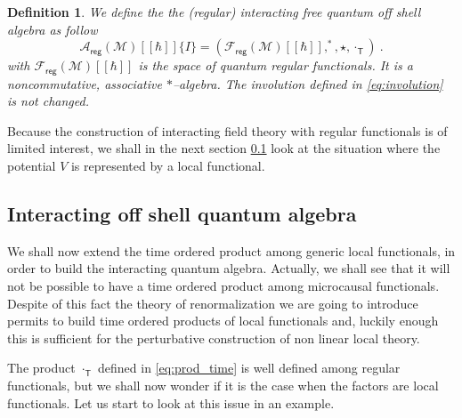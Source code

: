 \documentclass[11pt]{book}
\newcommand{\reg}{\mathsf{reg}}
\newcommand{\Acal}{\mathcal{A}}
\newcommand{\Fcal}{\mathcal{F}}
\newcommand{\Mcal}{\mathcal{M}}
\newcommand{\Tsf}{\mathsf{T}}
\theoremstyle{break}
\newtheorem{definition}{Definition}[chapter]
\begin{document}
\begin{definition}\label{def:alg_qT_reg}
We define the the (regular) interacting free quantum off shell algebra as follow
%
\begin{equation*}
\Acal_\reg(\Mcal)[[\hbar]]\{I\} = \left(\Fcal_\reg(\Mcal)[[\hbar]] , ^\ast , \star , \cdot_\Tsf \right) \ . 
\end{equation*}
%
with $\Fcal_\reg(\Mcal)[[\hbar]]$ is the space of quantum regular functionals. It is a noncommutative, associative $\ast$--algebra. The involution defined in \eqref{eq:involution} is not changed. 
\end{definition}


Because the construction of interacting field theory with regular functionals is of limited interest, we shall in the next section \ref{p:INT_Q_ALG} look at the situation where the potential $V$ is represented by a local functional.


\subsection{Interacting off shell quantum algebra}
\label{p:INT_Q_ALG}


We shall now extend the time ordered product among generic local functionals, in order to build the interacting quantum algebra. Actually, we shall see that it will not be possible to have a time ordered product among microcausal functionals. Despite of this fact the theory of renormalization we are going to introduce permits to build time ordered products of local functionals and, luckily enough this is sufficient for the perturbative construction of non linear local theory.


The product $\cdot_\Tsf$ defined in \eqref{eq:prod_time} is well defined among regular functionals, but we shall now wonder if it is the case when the factors are local functionals. Let us start to look at this issue in an example.
\end{document}

